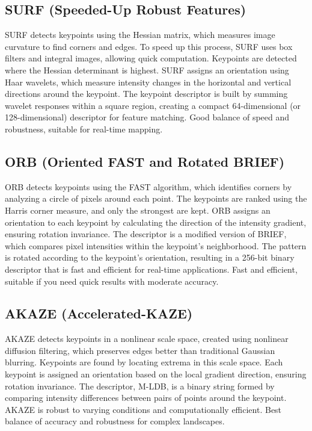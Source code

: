\subsection*{SURF (Speeded-Up Robust Features)}
SURF detects keypoints using the Hessian matrix, which measures image curvature to find corners and edges. To speed up this process, SURF uses box filters and integral images, allowing quick computation. Keypoints are detected where the Hessian determinant is highest. SURF assigns an orientation using Haar wavelets, which measure intensity changes in the horizontal and vertical directions around the keypoint. The keypoint descriptor is built by summing wavelet responses within a square region, creating a compact 64-dimensional (or 128-dimensional) descriptor for feature matching.
Good balance of speed and robustness, suitable for real-time mapping.

\subsection*{ORB (Oriented FAST and Rotated BRIEF)}
ORB detects keypoints using the FAST algorithm, which identifies corners by analyzing a circle of pixels around each point. The keypoints are ranked using the Harris corner measure, and only the strongest are kept. ORB assigns an orientation to each keypoint by calculating the direction of the intensity gradient, ensuring rotation invariance. The descriptor is a modified version of BRIEF, which compares pixel intensities within the keypoint's neighborhood. The pattern is rotated according to the keypoint's orientation, resulting in a 256-bit binary descriptor that is fast and efficient for real-time applications.
Fast and efficient, suitable if you need quick results with moderate accuracy.


\subsection*{AKAZE (Accelerated-KAZE)}
AKAZE detects keypoints in a nonlinear scale space, created using nonlinear diffusion filtering, which preserves edges better than traditional Gaussian blurring. Keypoints are found by locating extrema in this scale space. Each keypoint is assigned an orientation based on the local gradient direction, ensuring rotation invariance. The descriptor, M-LDB, is a binary string formed by comparing intensity differences between pairs of points around the keypoint. AKAZE is robust to varying conditions and computationally efficient.
Best balance of accuracy and robustness for complex landscapes.


